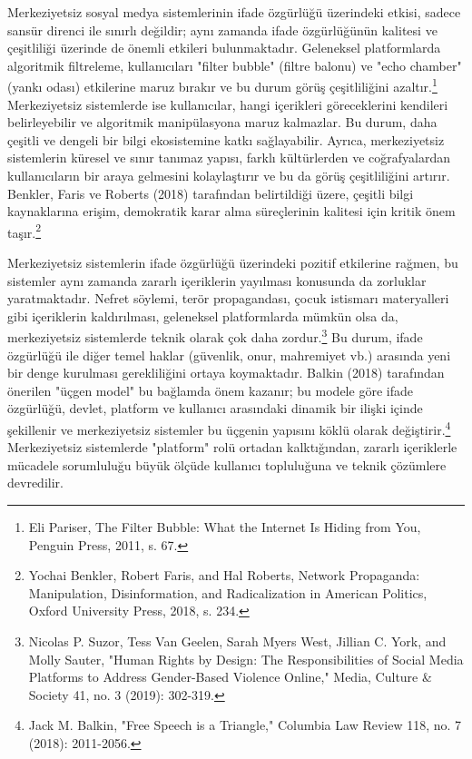 \documentclass[11pt,a4paper]{article}
\begin{document}
Merkeziyetsiz sosyal medya sistemlerinin ifade özgürlüğü üzerindeki etkisi, sadece sansür direnci ile sınırlı değildir; aynı zamanda ifade özgürlüğünün kalitesi ve çeşitliliği üzerinde de önemli etkileri bulunmaktadır. Geleneksel platformlarda algoritmik filtreleme, kullanıcıları "filter bubble" (filtre balonu) ve "echo chamber" (yankı odası) etkilerine maruz bırakır ve bu durum görüş çeşitliliğini azaltır.\footnote{Eli Pariser, The Filter Bubble: What the Internet Is Hiding from You, Penguin Press, 2011, s. 67.} Merkeziyetsiz sistemlerde ise kullanıcılar, hangi içerikleri göreceklerini kendileri belirleyebilir ve algoritmik manipülasyona maruz kalmazlar. Bu durum, daha çeşitli ve dengeli bir bilgi ekosistemine katkı sağlayabilir. Ayrıca, merkeziyetsiz sistemlerin küresel ve sınır tanımaz yapısı, farklı kültürlerden ve coğrafyalardan kullanıcıların bir araya gelmesini kolaylaştırır ve bu da görüş çeşitliliğini artırır. Benkler, Faris ve Roberts (2018) tarafından belirtildiği üzere, çeşitli bilgi kaynaklarına erişim, demokratik karar alma süreçlerinin kalitesi için kritik önem taşır.\footnote{Yochai Benkler, Robert Faris, and Hal Roberts, Network Propaganda: Manipulation, Disinformation, and Radicalization in American Politics, Oxford University Press, 2018, s. 234.}

Merkeziyetsiz sistemlerin ifade özgürlüğü üzerindeki pozitif etkilerine rağmen, bu sistemler aynı zamanda zararlı içeriklerin yayılması konusunda da zorluklar yaratmaktadır. Nefret söylemi, terör propagandası, çocuk istismarı materyalleri gibi içeriklerin kaldırılması, geleneksel platformlarda mümkün olsa da, merkeziyetsiz sistemlerde teknik olarak çok daha zordur.\footnote{Nicolas P. Suzor, Tess Van Geelen, Sarah Myers West, Jillian C. York, and Molly Sauter, "Human Rights by Design: The Responsibilities of Social Media Platforms to Address Gender-Based Violence Online," Media, Culture & Society 41, no. 3 (2019): 302-319.} Bu durum, ifade özgürlüğü ile diğer temel haklar (güvenlik, onur, mahremiyet vb.) arasında yeni bir denge kurulması gerekliliğini ortaya koymaktadır. Balkin (2018) tarafından önerilen "üçgen model" bu bağlamda önem kazanır; bu modele göre ifade özgürlüğü, devlet, platform ve kullanıcı arasındaki dinamik bir ilişki içinde şekillenir ve merkeziyetsiz sistemler bu üçgenin yapısını köklü olarak değiştirir.\footnote{Jack M. Balkin, "Free Speech is a Triangle," Columbia Law Review 118, no. 7 (2018): 2011-2056.} Merkeziyetsiz sistemlerde "platform" rolü ortadan kalktığından, zararlı içeriklerle mücadele sorumluluğu büyük ölçüde kullanıcı topluluğuna ve teknik çözümlere devredilir.
\end{document}
